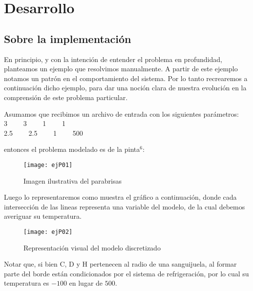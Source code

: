 \section{Desarrollo}

\subsection{Sobre la implementación}
En principio, y con la intención de entender el problema en profundidad, planteamos un ejemplo que resolvimos manualmente. A partir de este ejemplo
notamos un patrón en el comportamiento del sistema. Por lo tanto recrearemos a continuación dicho ejemplo, para dar una noción clara de nuestra 
evolución en la comprensión de este problema particular.

Asumamos que recibimos un archivo de entrada con los siguientes parámetros:\\

3 \ \ \ \   3  \ \ \ \ 1 \ \ \ \ 1\\
2.5  \ \ \ \ 2.5 \ \ \ \ 1  \ \ \ \ 500

entonces el problema modelado es de la pinta$^6$:

\begin{figure}[]
    \texttt{[image: ejP01]}
    \caption{Imagen ilustrativa del parabrisas}
\end{figure}

Luego lo representaremos como muestra el gráfico a continuación, donde cada intersección de las lineas representa una variable del modelo, de la cual
debemos averiguar su temperatura.

\begin{figure}[]
    \texttt{[image: ejP02]}
    \caption{Representación visual del modelo discretizado}
\end{figure}

Notar que, si bien C, D y H pertenecen al radio de una sanguijuela, al formar parte del borde están condicionados por el sistema de refrigeración,
por lo cual su temperatura es $-100$ en lugar de $500$.

